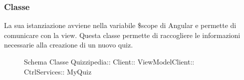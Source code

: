 \subsubsection{Classe }
La sua istanziazione avviene nella variabile \$scope di Angular e permette di comunicare con la view. Questa classe permette di raccogliere le informazioni necessarie alla creazione di un nuovo quiz.
\begin{figure}[H]
\centering
\noindent{}
\caption[Schema Classe MyQuiz]{Schema Classe Quizzipedia:: Client:: ViewModelClient:: CtrlServices:: MyQuiz}
\end{figure}
